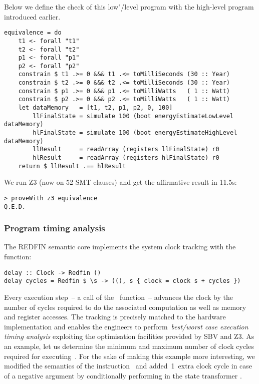 \noindent
Below we define the  check of this low"/level program with the
high-level program  introduced earlier.


\begin{verbatim}
equivalence = do
    t1 <- forall "t1"
    t2 <- forall "t2"
    p1 <- forall "p1"
    p2 <- forall "p2"
    constrain $ t1 .>= 0 &&& t1 .<= toMilliSeconds (30 :: Year)
    constrain $ t2 .>= 0 &&& t2 .<= toMilliSeconds (30 :: Year)
    constrain $ p1 .>= 0 &&& p1 .<= toMilliWatts   ( 1 :: Watt)
    constrain $ p2 .>= 0 &&& p2 .<= toMilliWatts   ( 1 :: Watt)
    let dataMemory   = [t1, t2, p1, p2, 0, 100]
        llFinalState = simulate 100 (boot energyEstimateLowLevel  dataMemory)
        hlFinalState = simulate 100 (boot energyEstimateHighLevel dataMemory)
        llResult     = readArray (registers llFinalState) r0
        hlResult     = readArray (registers hlFinalState) r0
    return $ llResult .== hlResult
\end{verbatim}


\noindent
We run Z3 (now on 52 SMT clauses) and get the affirmative result in 11.5s:


\begin{verbatim}
> proveWith z3 equivalence
Q.E.D.
\end{verbatim}



\subsubsection{Program timing analysis}

The REDFIN semantic core implements the system clock tracking with the~
function:


\begin{verbatim}
delay :: Clock -> Redfin ()
delay cycles = Redfin $ \s -> ((), s { clock = clock s + cycles })
\end{verbatim}

Every execution step~-- a call of the~ function~-- advances
the clock by the number of cycles required to do the associated computation as well
as memory and register accesses. The tracking is precisely matched to the hardware
implementation and enables the engineers to
perform~\emph{best/worst case execution timing analysis} exploiting the
optimisation facilities provided by SBV and Z3. As an example, let us determine
the minimum and maximum number of clock cycles required for
executing~. For the sake of making this example more
interesting, we modified the semantics of the instruction~ and
added~1~extra clock cycle in case of a negative argument by conditionally performing
 in the state transformer .


